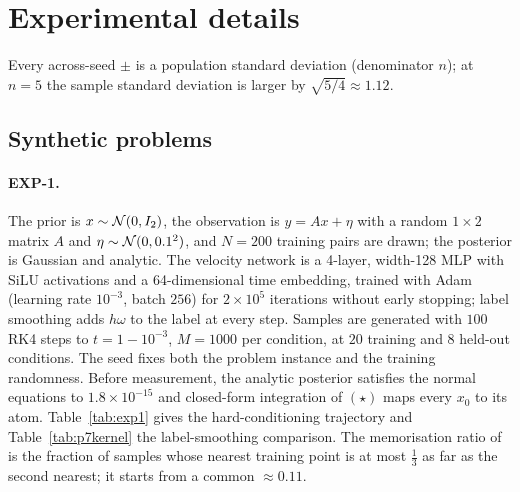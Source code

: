 \documentclass{article} %
\makeatletter
\newif\ificlr
\newcommand{\placeblock}[1]{\ificlr\@nameuse{moved@#1}\fi}
\theoremstyle{plain}
\theoremstyle{definition}
\theoremstyle{remark}
\makeatother
\begin{document}
\section{Experimental details}
\label{app:expdetails}

Every across-seed $\pm$ is a population standard deviation (denominator $n$); at $n=5$ the
sample standard deviation is larger by $\sqrt{5/4}\approx1.12$.

\subsection{Synthetic problems}
\label{app:exp}

\paragraph{EXP-1.} The prior is $x\sim\mathcal{N}(0,I_2)$, the observation is $y=Ax+\eta$ with a random
$1\times2$ matrix $A$ and $\eta\sim\mathcal{N}(0,0.1^2)$, and $N=200$ training pairs are drawn; the
posterior is Gaussian and analytic. The velocity network is a 4-layer, width-128 MLP with SiLU
activations and a 64-dimensional time embedding, trained with Adam (learning rate $10^{-3}$,
batch $256$) for $2\times10^5$ iterations without early stopping; label smoothing adds
$h\omega$ to the label at every step. Samples are generated with $100$ RK4 steps to
$t=1-10^{-3}$, $M=1000$ per condition, at $20$ training and $8$ held-out conditions. The seed fixes
both the problem instance and the training randomness. Before measurement, the analytic posterior
satisfies the normal equations to $1.8\times10^{-15}$ and closed-form integration of $(\star)$ maps
every $x_0$ to its atom. Table~\ref{tab:exp1} gives the hard-conditioning trajectory and
Table~\ref{tab:p7kernel} the label-smoothing comparison. The memorisation ratio of
\citet{yoon2023memorization} is the fraction of samples whose nearest training point is at most
$\tfrac13$ as far as the second nearest; it starts from a common $\approx0.11$.
\placeblock{portrait}
\placeblock{kernelfig}
\end{document}
